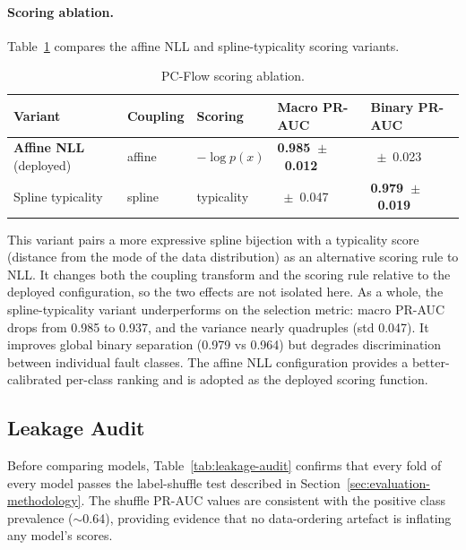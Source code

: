 \paragraph{Scoring ablation.}
Table~\ref{tab:pcflow-score-abl} compares the affine NLL and spline-typicality scoring variants.
\begin{table}[H]
\centering
\caption{PC-Flow scoring ablation.\label{tab:pcflow-score-abl}}
\footnotesize
\begin{tabularx}{\textwidth}{l >{\centering\arraybackslash}X >{\centering\arraybackslash}X >{\centering\arraybackslash}X >{\centering\arraybackslash}X}
\toprule
\textbf{Variant} & \textbf{Coupling} & \textbf{Scoring} & \textbf{Macro PR-AUC} & \textbf{Binary PR-AUC} \\
\midrule
\textbf{Affine NLL} (deployed) & affine & $-\log p(x)$  & \textbf{0.985~$\pm$~0.012} & 0.964~$\pm$~0.023 \\
Spline typicality               & spline & typicality    & 0.937~$\pm$~0.047          & \textbf{0.979~$\pm$~0.019} \\
\bottomrule
\end{tabularx}
\end{table}

This variant pairs a more expressive spline bijection with a typicality score (distance from the mode of the data distribution) as an alternative scoring rule to NLL. It changes both the coupling transform and the scoring rule relative to the deployed configuration, so the two effects are not isolated here. As a whole, the spline-typicality variant underperforms on the selection metric: macro PR-AUC drops from 0.985 to 0.937, and the variance nearly quadruples (std 0.047). It improves global binary separation (0.979 vs 0.964) but degrades discrimination between individual fault classes. The affine NLL configuration provides a better-calibrated per-class ranking and is adopted as the deployed scoring function.

\subsection{Leakage Audit}\label{sec:ad-leakage}

Before comparing models, Table~\ref{tab:leakage-audit} confirms that every fold of every model passes the label-shuffle test described in Section~\ref{sec:evaluation-methodology}. The shuffle PR-AUC values are consistent with the positive class prevalence ($\sim$0.64), providing evidence that no data-ordering artefact is inflating any model's scores.

